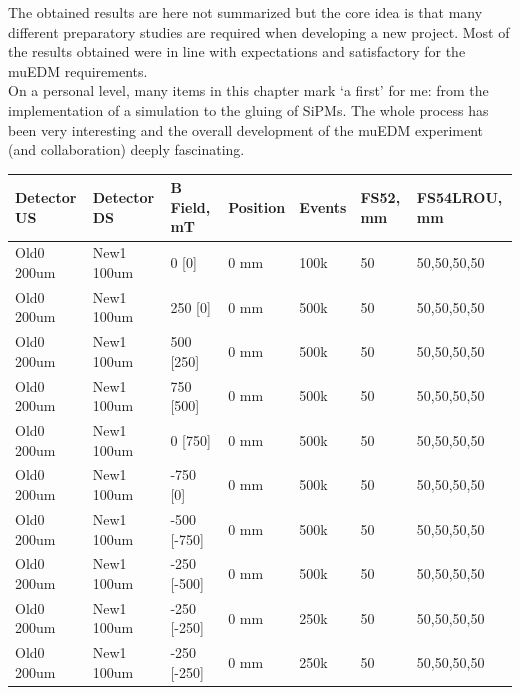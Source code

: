 \begin{refsection}
    \noindent
    The obtained results are here not summarized but the core idea is that many different preparatory studies are required when developing a new project. 
    Most of the results obtained were in line with expectations and satisfactory for the muEDM requirements.\\

    \noindent
    On a personal level, many items in this chapter mark `a first' for me: from the implementation of a \gf simulation to the gluing of SiPMs. 
    The whole process has been very interesting and the overall development of the muEDM experiment (and collaboration) deeply fascinating.

        \begin{table}
        \centering
        \tiny
            \begin{tabular}{|l|l|l|l|l|l|l|}
            \hline
            Detector US & Detector DS & B Field, mT & Position & Events & FS52, mm & FS54LROU, mm \\ \hline
            Old0 200um  & New1 100um  & 0 {[}0{]}        & 0 mm     & 100k   & 50            & 50,50,50,50       \\ \hline
            Old0 200um  & New1 100um  & 250 {[}0{]}      & 0 mm     & 500k   & 50            & 50,50,50,50       \\ \hline
            Old0 200um  & New1 100um  & 500 {[}250{]}    & 0 mm     & 500k   & 50            & 50,50,50,50       \\ \hline
            Old0 200um  & New1 100um  & 750 {[}500{]}    & 0 mm     & 500k   & 50            & 50,50,50,50       \\ \hline
            Old0 200um  & New1 100um  & 0 {[}750{]}      & 0 mm     & 500k   & 50            & 50,50,50,50       \\ \hline
            Old0 200um  & New1 100um  & -750 {[}0{]}     & 0 mm     & 500k   & 50            & 50,50,50,50       \\ \hline
            Old0 200um  & New1 100um  & -500 {[}-750{]}  & 0 mm     & 500k   & 50            & 50,50,50,50       \\ \hline
            Old0 200um  & New1 100um  & -250 {[}-500{]}  & 0 mm     & 500k   & 50            & 50,50,50,50       \\ \hline
            Old0 200um  & New1 100um  & -250 {[}-250{]}  & 0 mm     & 250k   & 50            & 50,50,50,50       \\ \hline
            Old0 200um  & New1 100um  & -250 {[}-250{]}  & 0 mm     & 250k   & 50            & 50,50,50,50       \\ \hline

\end{tabular}
\end{table}
\end{refsection}
